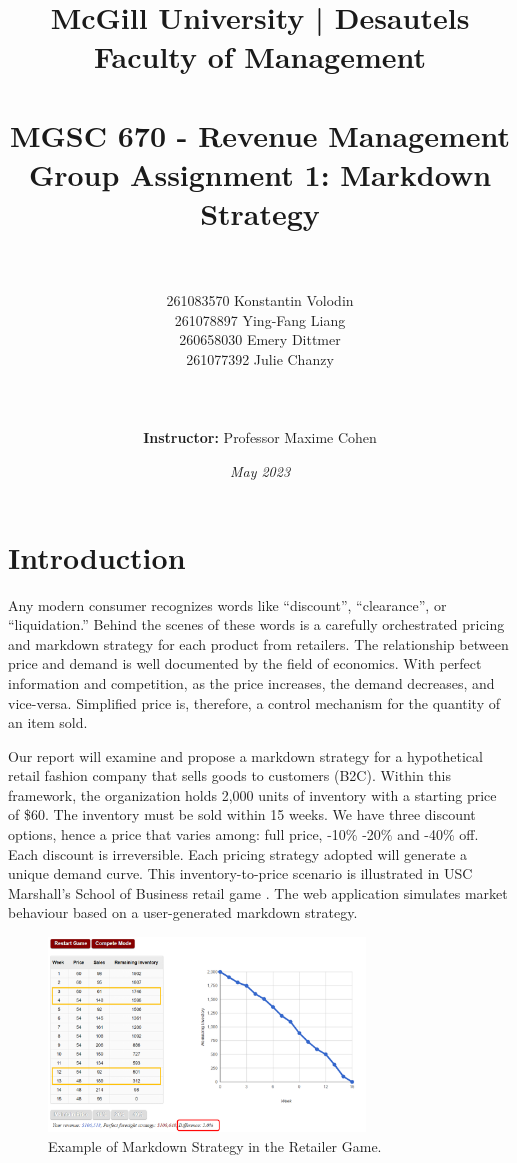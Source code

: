 \documentclass[11pt,a4paper]{article}
\title{
\large{McGill University | Desautels Faculty of Management}\\
\hfill \break
\hfill \break
\hfill \break
\hfill \break
\\\Large MGSC 670 - Revenue Management\\
\textbf{Group Assignment 1: Markdown Strategy}\\
\hfill \break
\hfill \break
}
\author{\\\\
261083570 Konstantin Volodin\\
261078897 Ying-Fang Liang\\
260658030 Emery Dittmer\\
261077392 Julie Chanzy\\\\
\hfill \break
\\\\\textbf{Instructor:} Professor Maxime Cohen\\
\hfill \break
}
\date{\emph{May 2023}}
\begin{document}
\maketitle
\thispagestyle{empty}
\pagebreak

\tableofcontents
{}
\pagebreak

\setcounter{page}{1}
\section{Introduction}
Any modern consumer recognizes words like “discount”, “clearance”, or “liquidation.” 
Behind the scenes of these words is a carefully orchestrated pricing and markdown strategy for each product from retailers. 
The relationship between price and demand is well documented by the field of economics. 
With perfect information and competition, as the price increases, the demand decreases, and vice-versa. 
Simplified price is, therefore, a control mechanism for the quantity of an item sold. 

Our report will examine and propose a markdown strategy for a hypothetical retail fashion company that sells goods to customers (B2C). 
Within this framework, the organization holds 2,000 units of inventory with a starting price of \$60. 
The inventory must be sold within 15 weeks. We have three discount options, hence a price that varies among: full price, -10\% -20\% and -40\% off. 
Each discount is irreversible. Each pricing strategy adopted will generate a unique demand curve. 
This inventory-to-price scenario is illustrated in USC Marshall’s School of Business retail game \cite{RetailerGame}. 
The web application simulates market behaviour based on a user-generated markdown strategy.\\

\begin{figure}[h]
    \centering
    \includegraphics[width=0.75\textwidth]{pic/f1.png}
    \caption{Example of Markdown Strategy in the Retailer Game. \\\cite{RetailerGame}}
\end{figure}
\end{document}
